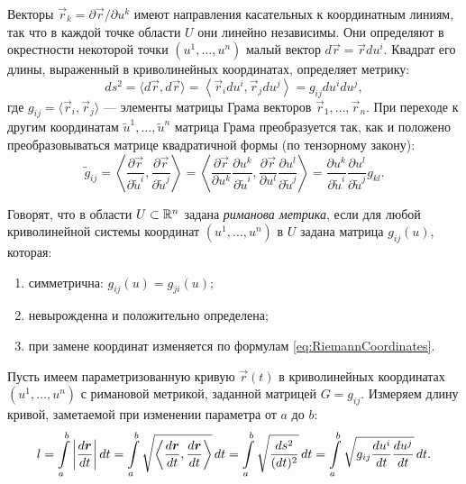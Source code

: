 Векторы $\vec{r}_k = \partial \vec{r} / \partial u^k$ имеют направления касательных к координатным линиям, так что в каждой точке области $U$ они линейно независимы. Они определяют в окрестности некоторой точки $(u^1, \ldots, u^n)$ малый вектор $d\vec{r} = \vec{r}du^i$. Квадрат его длины, выраженный в криволинейных координатах, определяет метрику:
\[
	ds^2 = \langle d\vec{r}, d\vec{r}\rangle = \left\langle\vec{r}_idu^i, \vec{r}_jdu^j\right\rangle = g_{ij}du^idu^j,
\]
где $g_{ij} = \langle\vec{r}_i, \vec{r}_j\rangle$ --- элементы матрицы Грама векторов $\vec{r}_1, \ldots, \vec{r}_n$. При переходе к другим координатам $\widetilde{u}^1, \ldots, \widetilde{u}^n$ матрица Грама преобразуется так, как и положено преобразовываться матрице квадратичной формы (по тензорному закону):
\begin{equation} \label{eq:RiemannCoordinates}
	\widetilde{g}_{ij} = \left\langle\frac{\partial \vec{r}}{\partial\widetilde{u}^i}, \frac{\partial \vec{r}}{\partial\widetilde{u}^j}\right\rangle = \left\langle\frac{\partial \vec{r}}{\partial u^k}\frac{\partial u^k}{\partial\widetilde{u}^i}, \frac{\partial \vec{r}}{\partial u^l}\frac{\partial u^l}{\partial\widetilde{u}^j}\right\rangle = \frac{\partial u^k}{\partial\widetilde{u}^i}\frac{\partial u^l}{\partial\widetilde{u}^j}g_{kl}.
\end{equation}

\begin{definition} \label{definition:RiemannMetrics}
	Говорят, что в области $U \subset \mathbb{R}^n$ задана \textit{риманова метрика}, если для любой криволинейной системы координат $(u^1, \ldots, u^n)$ в $U$ задана матрица $g_{ij}(u)$, которая:
	\begin{enumerate}[nolistsep, label=(\arabic*)]
		\item симметрична: $g_{ij}(u) = g_{ji}(u)$;
		\item невырожденна и положительно определена;
		\item при замене координат изменяется по формулам \eqref{eq:RiemannCoordinates}.
	\end{enumerate}
\end{definition}

Пусть имеем параметризованную кривую $\vec{r}(t)$ в криволинейных координатах $(u^1, \ldots, u^n)$ с римановой метрикой, заданной матрицей $G = g_{ij}$. Измеряем длину кривой, заметаемой при изменении параметра от $a$ до $b$:
\begin{equation} \label{eq:RiemannLength}
	l = \int\limits_a^b\left\lvert\frac{d\boldsymbol{r}}{dt}\right\rvert dt = \int\limits_a^b\sqrt{\left\langle \frac{d\boldsymbol{r}}{dt}, \frac{d\boldsymbol{r}}{dt} \right\rangle}\,dt = \int\limits_a^b\sqrt{\frac{ds^2}{(dt)^2}}\,dt = \int\limits_a^b\sqrt{g_{ij}\frac{du^i}{dt}\frac{du^j}{dt}}\,dt.
\end{equation}

